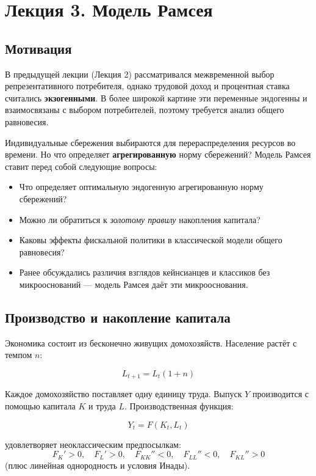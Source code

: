 \documentclass[10pt,a4paper]{article}
\begin{document}
\newpage
\section{Лекция 3. Модель Рамсея}

\subsection{Мотивация}

В предыдущей лекции (Лекция 2) рассматривался межвременной выбор репрезентативного потребителя, однако трудовой доход и процентная ставка считались \textbf{экзогенными}. В более широкой картине эти переменные эндогенны и взаимосвязаны с выбором потребителей, поэтому требуется анализ общего равновесия.

Индивидуальные сбережения выбираются для перераспределения ресурсов во времени. Но что определяет \textbf{агрегированную} норму сбережений? Модель Рамсея ставит перед собой следующие вопросы:
\begin{itemize}[leftmargin=1.3em]
\item Что определяет оптимальную эндогенную агрегированную норму сбережений?
\item Можно ли обратиться к \textit{золотому правилу} накопления капитала?
\item Каковы эффекты фискальной политики в классической модели общего равновесия?
\item Ранее обсуждались различия взглядов кейнсианцев и классиков без микрооснований — модель Рамсея даёт эти микрооснования.
\end{itemize}

\subsection{Производство и накопление капитала}

Экономика состоит из бесконечно живущих домохозяйств. Население растёт с темпом $n$:
\begin{formulabox}
\begin{equation}
L_{t+1} = L_t(1+n) \tag{3.1}
\end{equation}
\end{formulabox}

Каждое домохозяйство поставляет одну единицу труда. Выпуск $Y$ производится с помощью капитала $K$ и труда $L$. Производственная функция:
\begin{formulabox}
\begin{equation}
Y_t = F(K_t, L_t) \tag{3.1}
\end{equation}
\end{formulabox}
удовлетворяет неоклассическим предпосылкам:
$$F_K' > 0,\quad F_L' > 0,\quad F_{KK}'' < 0,\quad F_{LL}'' < 0,\quad F_{KL}'' > 0$$
(плюс линейная однородность и условия Инады).
\end{document}

